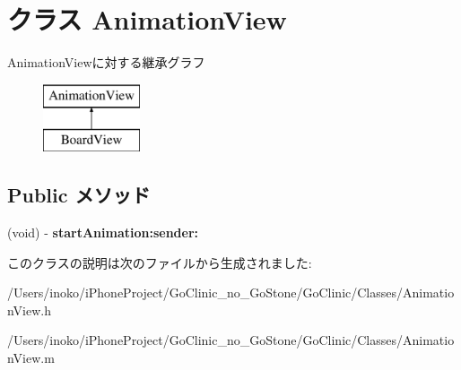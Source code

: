 \hypertarget{interface_animation_view}{
\section{クラス AnimationView}
\label{interface_animation_view}
}
AnimationViewに対する継承グラフ\begin{figure}[H]
\begin{center}
\leavevmode
\includegraphics[height=2.000000cm]{interface_animation_view}
\end{center}
\end{figure}
\subsection*{Public メソッド}
\begin{DoxyCompactItemize}
\item 
\hypertarget{interface_animation_view_a52a0feea360fc3dc7145f409bc66c176}{
(void) -\/ {\bfseries startAnimation:sender:}}
\label{interface_animation_view_a52a0feea360fc3dc7145f409bc66c176}

\end{DoxyCompactItemize}


このクラスの説明は次のファイルから生成されました:\begin{DoxyCompactItemize}
\item 
/Users/inoko/iPhoneProject/GoClinic\_\-no\_\-GoStone/GoClinic/Classes/AnimationView.h\item 
/Users/inoko/iPhoneProject/GoClinic\_\-no\_\-GoStone/GoClinic/Classes/AnimationView.m\end{DoxyCompactItemize}
